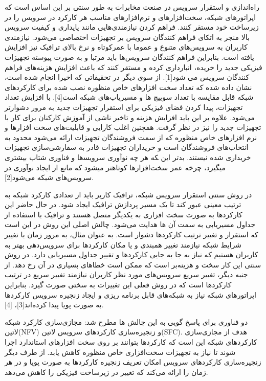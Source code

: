 
راه‌اندازی و استقرار سرویس در صنعت مخابرات به طور سنتی بر این اساس است که اپراتورهای شبکه، سخت‌افزارهای و نرم‌افزارهای مناسب هر کارکرد در سرویس را در زیرساخت خود مستقر کنند.
فراهم کردن نیازمندی‌هایی مانند پایداری و کیفیت سرویس بالا منجر به اتکای فراهم کنندگان سرویس بر تجهیزات اختصاصی می‌شود.
نیازمندی کاربران به سرویس‌های متنوع و عموما با عمرکوتاه و نرخ بالای ترافیک نیز افزایش یافته است.
بنابراین فراهم کنندگان سرویس‌ها باید مرتبا و به صورت پیوسته تجهیزات فیزیکی جدید را خریده، انبارداری کرده و مستقر کنند که باعث افزایش هزینه‌های فراهم کنندگان سرویس می شود[1].
از سوی دیگر در تحقیقاتی که اخیرا انجام شده است، نشان داده شده که تعداد سخت افزارهای خاص منظوره نصب شده برای کارکردهای شبکه قابل مقایسه با تعداد سوییچ ها و مسیریاب‌های شبکه
است[4].
با افزایش تعداد تجهیزات، پیدا کردن فضای فیزیکی برای استقرار تجهیزات جدید به مرور دشوارتر می‌شود.
علاوه بر این باید افزایش هزینه و تاخیر ناشی از آموزش کارکنان برای کار با تجهیزات جدید را نیز در نظر گرفت.
همچنین اغلب کارایی و قابلیت‌های سخت افزارها و نرم افزارهای خاص منظوره که از سمت فروشندگان تجهیزات ارائه می‌شود محدود به انتخاب‌های فروشندگان است
و خریداران تجهیزات قادر به سفارشی‌سازی تجهیزات خریداری شده نیستند.
بدتر این ‍که هر چه نوآوری سرویس‍‌ها و فناوری شتاب بیشتری می‍گیرد، چرخه عمر سخت‌افزارها کوتاه‍تر می‍شود که مانع از ایجاد نوآوری در سرویس‌های شبکه می‌شود[2].

در روش سنتی استقرار سرویس شبکه، ترافیک کاربر باید از تعدادی کارکرد شبکه به ترتیب معینی عبور کند تا یک مسیر پردازش ترافیک ایجاد شود.
در حال حاضر این کارکردها به صورت سخت افزاری به یکدیگر متصل هستند و ترافیک با استفاده از جداول مسیریابی به سمت آن ها هدایت می‌شود.
چالش اصلی این روش در این است که استقرار و تغییر ترتیب کارکردها دشوار است.
به عنوان مثال، به مرور زمان با تغییر شرایط شبکه نیازمند تغییر همبندی و یا مکان کارکردها برای سرویس‌دهی بهتر به کاربران هستیم
که نیاز به جا به جایی کارکردها و تغییر جداول مسیریابی دارد.
در روش سنتی این کار سخت و هزینه‌بر است که ممکن است خطاهای بسیاری در آن رخ دهد.
از جنبه دیگر، تغییر سریع سرویس‌های مورد نظر کاربران نیازمند تغییر سریع در ترتیب کارکردها است که در روش فعلی این تغییرات به سختی صورت گیرد.
بنابراین اپراتورهای شبکه نیاز به شبکه‌های قابل برنامه ریزی و ایجاد زنجیره سرویس کارکردها به صورت پویا پیدا کرده‌اند[3]، [4].‍‍

دو فناوری برای پاسخ گویی به این چالش ها مطرح شد: مجازی‌سازی کارکرد شبکه ‌لاتین{(NFV)} و زنجیره‌سازی کارکردهای سرویس ‌لاتین{(SFC)}.‍
هدف از مجازی‌سازی کارکردهای شبکه این است که کارکردها بتوانند بر روی سخت افزارهای استاندارد اجرا شوند تا
نیاز به تجهیزات سخت‌افزاری خاص منظوره کاهش یابد.
از طرف دیگر زنجیره‌سازی کارکردهای سرویس امکان تعریف زنجیره کارکردها به صورت پویا و در هر زمان را ارائه می‌کند که تغییر در زیرساخت فیزیکی را کاهش می‌دهد.

